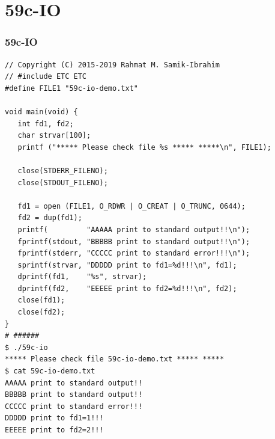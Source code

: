 \documentclass[xcolor=table, notheorems, hyperref={pdfpagelabels=false}]{beamer}
\begin{document}
\section{59c-IO}
\begin{frame}[fragile]
\frametitle{59c-IO}
\begin{lstlisting}[basicstyle=\ttfamily\tiny]
// Copyright (C) 2015-2019 Rahmat M. Samik-Ibrahim
// #include ETC ETC
#define FILE1 "59c-io-demo.txt"

void main(void) {
   int fd1, fd2;
   char strvar[100];
   printf ("***** Please check file %s ***** *****\n", FILE1);

   close(STDERR_FILENO);
   close(STDOUT_FILENO);

   fd1 = open (FILE1, O_RDWR | O_CREAT | O_TRUNC, 0644);
   fd2 = dup(fd1);
   printf(         "AAAAA print to standard output!!\n"); 
   fprintf(stdout, "BBBBB print to standard output!!\n"); 
   fprintf(stderr, "CCCCC print to standard error!!!\n");
   sprintf(strvar, "DDDDD print to fd1=%d!!!\n", fd1);
   dprintf(fd1,    "%s", strvar);
   dprintf(fd2,    "EEEEE print to fd2=%d!!!\n", fd2);
   close(fd1);
   close(fd2);
}
# ######
$ ./59c-io 
***** Please check file 59c-io-demo.txt ***** *****
$ cat 59c-io-demo.txt 
AAAAA print to standard output!!
BBBBB print to standard output!!
CCCCC print to standard error!!!
DDDDD print to fd1=1!!!
EEEEE print to fd2=2!!!

\end{lstlisting}
\end{frame}
\end{document}

